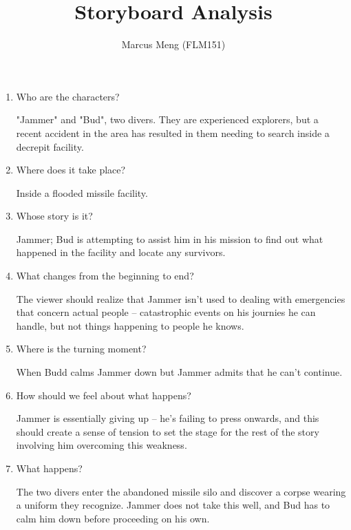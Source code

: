 \documentclass{article}
\title{Storyboard Analysis}
\author{Marcus Meng (FLM151)}
\begin{document}
\maketitle

\begin{enumerate}

\item Who are the characters?

"Jammer" and "Bud", two divers.
They are experienced explorers, but a recent accident in the area has resulted in them needing to search inside a decrepit facility.

\item Where does it take place?

Inside a flooded missile facility.

\item Whose story is it?

Jammer; Bud is attempting to assist him in his mission to find out what happened in the facility and locate any survivors.

\item What changes from the beginning to end?

The viewer should realize that Jammer isn't used to dealing with emergencies that concern actual people -- catastrophic events on his journies he can handle, but not things happening to people he knows.

\item Where is the turning moment?

When Budd calms Jammer down but Jammer admits that he can't continue.

\item How should we feel about what happens?

Jammer is essentially giving up -- he's failing to press onwards, and this should create a sense of tension to set the stage for the rest of the story involving him overcoming this weakness.

\item What happens?

The two divers enter the abandoned missile silo and discover a corpse wearing a uniform they recognize.
Jammer does not take this well, and Bud has to calm him down before proceeding on his own.

\end{enumerate}
\end{document}
